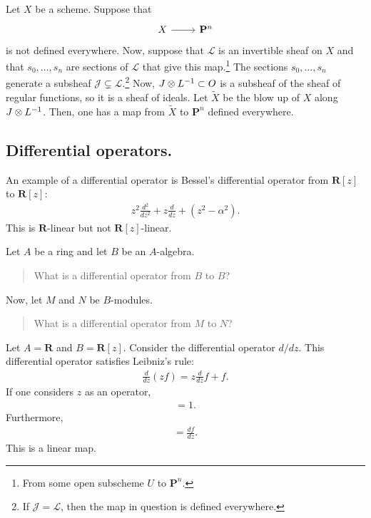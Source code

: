 \documentclass [11 pt, oneside] {article}
\begin{document}
Let $X$ be a scheme. Suppose that
\[
\begin{tikzcd}
	X\ar[r] & \mathbf{P}^n
\end{tikzcd}
\]
is not defined everywhere.
Now, suppose that $\mathscr{L}$ is an invertible sheaf on $X$ and that $s_0,\hdots,s_n$ are sections of $\mathscr{L}$ that give this map.\footnote{From some open subscheme $U$ to $\mathbf{P}^n$.} 
The sections $s_0,\hdots,s_n$ generate a subsheaf $\mathscr{J}\subsetneq \mathscr{L}$.\footnote{If $\mathscr{J}=\mathscr{L}$, then the map in question is defined everywhere.} 
Now, $\relax{J}\otimes \relax{L}^{-1}\subset \relax{O}$ is a subsheaf of the sheaf of regular functions, so it is a sheaf of ideals.
Let $\tilde X$ be the blow up of $X$ along $\relax{J}\otimes \relax{L}^{-1}$. Then, one has a map from $\tilde X$ to $\mathbf{P}^n$ defined everywhere.

\subsection{Differential operators.}
An example of a differential operator is Bessel's differential operator from $\mathbf{R}[z]$ to $\mathbf{R}[z]$:
\begin{align*}
	z^2 \frac{d^2}{dz^2} + z\frac{d}{dz}+(z^2-\alpha^2).
\end{align*}
This is $\mathbf{R}$-linear but not $\mathbf{R}[z]$-linear.

Let $A$ be a ring and let $B$ be an $A$-algebra. 
\begin{quote}
	\small What is a differential operator from $B$ to $B$?
\end{quote}
Now, let $M$ and $N$ be $B$-modules.
\begin{quote}
	\small What is a differential operator from $M$ to $N$?
\end{quote}

\begin{example}[ ]\label{}\text{}
Let $A=\mathbf{R}$ and $B=\mathbf{R}[z]$. Consider the differential operator $d/dz$.
This differential operator satisfies Leibniz's rule:
\begin{align*}
	\frac{d}{dz}(zf) = z \frac{d}{dz}f + f.
\end{align*}
If one considers $z$ as an operator,
\begin{align*}
	[d/dz,z]=1.
\end{align*}
Furthermore,
\begin{align*}
	[d/dz,f] = \frac{df}{dz}.
\end{align*}
This is a linear map.
\end{example}
\end{document}

